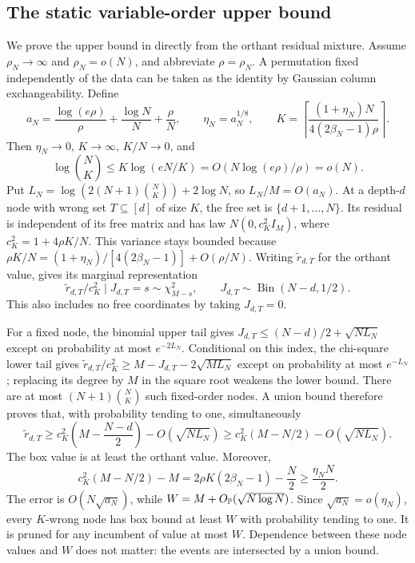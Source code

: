 \subsection{The static variable-order upper bound}
\label{app:bls-static-upper-proof}

We prove the upper bound in  directly from the
orthant residual mixture.  Assume $\rho_N\to\infty$ and $\rho_N=o(N)$,
and abbreviate $\rho=\rho_N$.  A permutation fixed independently of
the data can be taken as the identity by Gaussian column exchangeability.
Define
\[
 a_N=\frac{\log(e\rho)}\rho+\frac{\log N}N+\frac\rho N,
 \qquad \eta_N=a_N^{1/8},\qquad
 K=\left\lceil\frac{(1+\eta_N)N}{4(2\beta_N-1)\rho}\right\rceil.
\]
Then $\eta_N\to0$, $K\to\infty$, $K/N\to0$, and
\begin{equation}
 \log\binom NK\le K\log(eN/K)=O(N\log(e\rho)/\rho)=o(N).
 \label{app:bls-small-set-entropy}
\end{equation}
Put $L_N=\log(2(N+1)\binom NK)+2\log N$, so $L_N/M=O(a_N)$.
At a depth-$d$ node with wrong set $T\subseteq[d]$ of size $K$, the
free set is $\{d+1,\ldots,N\}$.  Its residual is independent of its
free matrix and has law $N(0,c_K^2I_M)$, where
$c_K^2=1+4\rho K/N$.  This variance stays bounded because
$\rho K/N=(1+\eta_N)/[4(2\beta_N-1)]+O(\rho/N)$.
Writing $\widetilde r_{d,T}$ for the orthant value,
 gives its marginal representation
\[
 \widetilde r_{d,T}/c_K^2\mid J_{d,T}=s\sim\chi^2_{M-s},
 \qquad J_{d,T}\sim\operatorname{Bin}(N-d,1/2).
\]
This also includes no free coordinates by taking $J_{d,T}=0$.

For a fixed node, the binomial upper tail gives
$J_{d,T}\le(N-d)/2+\sqrt{NL_N}$ except on probability at most
$e^{-2L_N}$.  Conditional on this index, the chi-square lower tail gives
$\widetilde r_{d,T}/c_K^2\ge M-J_{d,T}-2\sqrt{ML_N}$ except on
probability at most $e^{-L_N}$; replacing its degree by $M$ in the square
root weakens the lower bound.  There are at most
$(N+1)\binom NK$ such fixed-order nodes.  A union bound therefore proves
that, with probability tending to one, simultaneously
\[
 \widetilde r_{d,T}
 \ge c_K^2\left(M-\frac{N-d}2\right)-O(\sqrt{NL_N})
 \ge c_K^2(M-N/2)-O(\sqrt{NL_N}).
\]
The box value is at least the orthant value.  Moreover,
\[
 c_K^2(M-N/2)-M
 =2\rho K(2\beta_N-1)-\frac N2\ge\frac{\eta_NN}{2}.
\]
The error is $O(N\sqrt{a_N})$, while
$W=M+O_{\mathbb{P}}(\sqrt{N\log N})$.  Since
$\sqrt{a_N}=o(\eta_N)$, every $K$-wrong node has box bound at least
$W$ with probability tending to one.  It is pruned for any incumbent of
value at most $W$.  Dependence between these node values and $W$ does
not matter: the events are intersected by a union bound.

